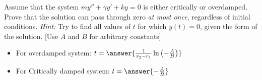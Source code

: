 \documentclass{ximera}
\begin{document}
\begin{exercise}
    Assume that the system $my'' + \gamma y' + ky = 0$ is either critically or overdamped. Prove that the solution can pass through zero \emph{at most once}, regardless of initial conditions. \emph{Hint:} Try to find all values of $t$ for which $y(t) = 0$, given the form of the solution. [Use $A$ and $B$ for arbitrary constants]
    \begin{itemize}
        \item For overdamped system: $t = \answer{\frac{1}{r_2 - r_1}\ln\left(-\frac{A}{B}\right)}$
        \item For Critically damped system: $t = \answer{-\frac{A}{B}}$
    \end{itemize}
\end{exercise}
%
\end{document}
